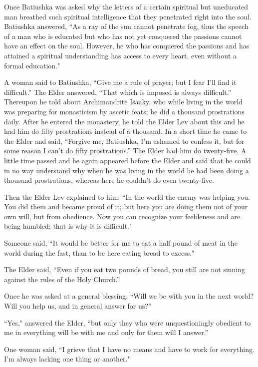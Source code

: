 Once Batiushka was asked why the letters of a certain spiritual but uneducated man breathed such spiritual intelligence that they penetrated right into the soul. Batiushka answered, “As a ray of the sun cannot penetrate fog, thus the speech of a man who is educated but who has not yet conquered the passions cannot have an effect on the soul. However, he who has conquered the passions and has attained a spiritual understanding has access to every heart, even without a formal education."

A woman said to Batiushka, “Give me a rule of prayer; but I fear I'll find it difficult.” The Elder answered, “That which is imposed is always difficult.” Thereupon he told about Archimandrite Isaaky, who while living in the world was preparing for monasticism by ascetic feats; he did a thousand prostrations daily. After he entered the monastery, he told the Elder Lev about this and he had him do fifty prostrations instead of a thousand. In a short time he came to the Elder and said, “Forgive me, Batiushka, I'm ashamed to confess it, but for some reason I can't do fifty prostrations.” The Elder had him do twenty-five. A little time passed and he again appeared before the Elder and said that he could in no way understand why when he was living in the world he had been doing a thousand prostrations, whereas here he couldn't do even twenty-five.

Then the Elder Lev explained to him: “In the world the enemy was helping you. You did them and became proud of it; but here you are doing them not of your own will, but from obedience. Now you can recognize your feebleness and are being humbled; that is why it is difficult."

Someone said, “It would be better for me to eat a half pound of meat in the world during the fast, than to be here eating bread to excess."

The Elder said, “Even if you eat two pounds of bread, you still are not sinning against the rules of the Holy Church.”

Once he was asked at a general blessing, “Will we be with you in the next world? Will you help us, and in general answer for us?”

“Yes," answered the Elder, “but only they who were unquestioningly obedient to me in everything will be with me and only for them will I answer.”

One woman said, “I grieve that I have no means and have to work for everything. I'm always lacking one thing or another."

